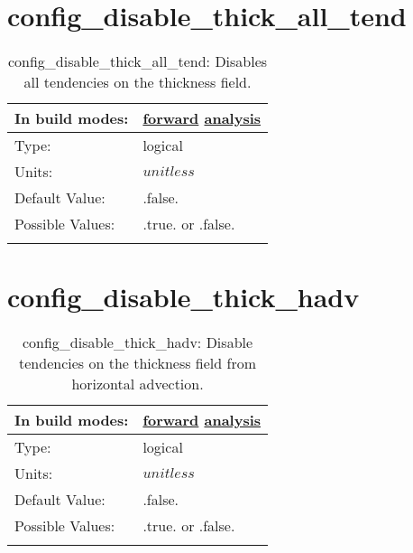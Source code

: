 \section[config\_disable\_thick\_all\_tend]{config\_disable\_thick\_all\_tend}
\label{sec:nm_sec_config_disable_thick_all_tend}
\begin{center}
\begin{longtable}{| p{2.0in} || p{4.0in} |}
    \hline
    In build modes: & \hyperref[subsec:forward_nm_tab_debug]{forward} \hyperref[subsec:analysis_nm_tab_debug]{analysis} \\
    \hline
    Type: & logical \\
    \hline
    Units: & $unitless$ \\
    \hline
    Default Value: & .false. \\
    \hline
    Possible Values: & .true. or .false. \\
    \hline
    \caption{config\_disable\_thick\_all\_tend: Disables all tendencies on the thickness field.}
\end{longtable}
\end{center}
\section[config\_disable\_thick\_hadv]{config\_disable\_thick\_hadv}
\label{sec:nm_sec_config_disable_thick_hadv}
\begin{center}
\begin{longtable}{| p{2.0in} || p{4.0in} |}
    \hline
    In build modes: & \hyperref[subsec:forward_nm_tab_debug]{forward} \hyperref[subsec:analysis_nm_tab_debug]{analysis} \\
    \hline
    Type: & logical \\
    \hline
    Units: & $unitless$ \\
    \hline
    Default Value: & .false. \\
    \hline
    Possible Values: & .true. or .false. \\
    \hline
    \caption{config\_disable\_thick\_hadv: Disable tendencies on the thickness field from horizontal advection.}
\end{longtable}
\end{center}
